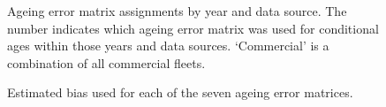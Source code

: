 \documentclass[
]{scrartcl}
\begin{document}
\begin{figure}[H]


\caption{\label{fig-AE_matrices}Ageing error matrix assignments by year
and data source. The number indicates which ageing error matrix was used
for conditional ages within those years and data sources. `Commercial'
is a combination of all commercial fleets.}

\end{figure}%

\begin{figure}[H]


\caption{\label{fig-AE_bias}Estimated bias used for each of the seven
ageing error matrices.}

\end{figure}%
\end{document}
